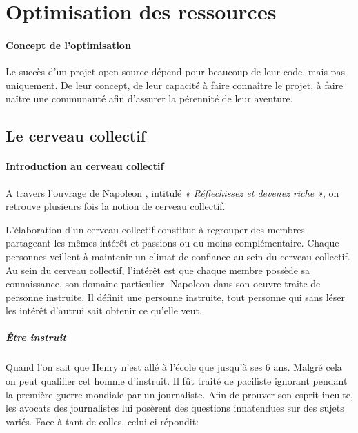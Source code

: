 	\section{Optimisation des ressources} %

		\paragraph{Concept de l'optimisation\\}

	 		Le succès d'un projet open source dépend pour beaucoup de leur code, mais pas uniquement. De leur concept, de leur capacité à faire connaître le projet, à faire naître une communauté afin d'assurer la pérennité de leur aventure.

		\subsection{Le cerveau collectif}
			\paragraph{Introduction au cerveau collectif\\}

				A travers l'ouvrage de Napoleon , intitulé \emph{« Réflechissez et devenez riche »}, on retrouve plusieurs fois la notion de cerveau collectif.

				L'élaboration d'un cerveau collectif constitue à regrouper des membres partageant les mêmes intérêt et passions ou du moins complémentaire.
				Chaque personnes veillent à maintenir un climat de confiance au sein du cerveau collectif.
				Au sein du cerveau collectif, l'intérêt est que chaque membre possède sa connaissance, son domaine particulier. 
				Napoleon  dans son oeuvre traite de personne instruite. Il définit une personne instruite, tout personne qui sans léser les intérêt d'autrui sait obtenir ce qu'elle veut.

				\subparagraph{Être instruit\\}

					Quand l'on sait que Henry  n'est allé à l'école que jusqu'à ses 6 ans. Malgré cela on peut qualifier cet homme d'instruit. Il fût traité de pacifiste ignorant pendant la première guerre mondiale par un journaliste. Afin de prouver son esprit inculte, les avocats des journalistes lui posèrent des questions innatendues sur des sujets variés. Face à tant de colles, celui-ci répondit:

